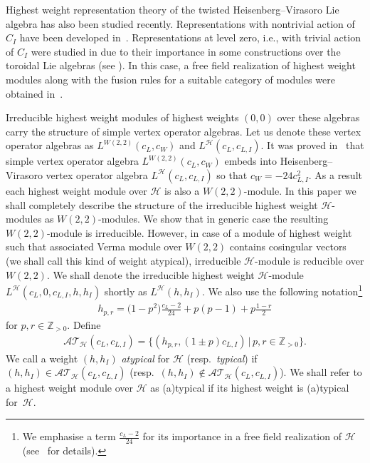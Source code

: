\documentclass[pdftex]{sigma}
\numberwithin{equation}{section}
\newcommand{\N}{{\mathbb Z}_{> 0} }
\newcommand{\HVir}{\mathcal H}
\begin{document}
Highest weight representation theory of the twisted Heisenberg--Virasoro Lie algebra has also been studied recently. Representations with nontrivial action of $C_{I}$ have been developed in~\cite{Arbarello}. Representations at level zero, i.e., with trivial action of $C_{I}$ were studied in \cite{Billig} due to their importance in some constructions over the toroidal Lie algebras (see \cite{Billig3, Billig2}). In this case, a free f\/ield realization of highest weight modules along with the fusion rules for a suitable category of modules were obtained in~\cite{nas}.

Irreducible highest weight modules of highest weights $(0,0)$ over these algebras carry the structure of simple vertex operator algebras. Let us denote these vertex operator algebras as $L^{W(2,2)} (c_L, c_W)$ and $L^{\HVir} (c_L, c_{L,I} )$. It was proved in~\cite{nas} that simple vertex operator algebra $L^{W(2,2)} (c_L, c_W)$ embeds into Heisenberg--Virasoro vertex operator algebra $L^{\HVir} (c_L, c_{L,I} )$ so that $c_W = -24 c_{L,I} ^2$. As a result each highest weight module over $\HVir$ is also a $W(2,2)$-module. In this paper we shall completely describe the structure of the irreducible highest weight $\HVir$-modules as $W(2,2)$-modules. We show that in generic case the resulting $W(2,2)$-module is irreducible. However, in case of a module of highest weight such that associated Verma module over $W(2,2)$ contains cosingular vectors (we shall call this kind of weight atypical), irreducible $\HVir$-module is reducible over $W(2,2)$.
We shall denote the irreducible highest weight $ \HVir $-module $L^{\HVir}(c_L,0,c_{L,I},h,h_I) $ shortly as $L^{\HVir}(h,h_I)$.
 We also use the following notation\footnote{We emphasise a term $\frac{c_L-2}{24} $ for its importance in a free f\/ield realization of $\HVir $ (see~\cite{nas} for details).}
\begin{gather*}
h_{p,r}=\big(1-p^{2}\big)\frac{c_{L}-2}{24}+p(p-1)+p\frac{1-r}{2} %
\end{gather*}
for $ p,r \in \N $. Def\/ine
\begin{gather*}
{\mathcal {AT} }_{\HVir} ( c_L, c_{L,I} ) = \{ (h_{p,r},(1\pm p)c_{L,I}) \,|\, p,r \in \N \}.
\end{gather*}
We call a weight $(h,h_I)$ \textit{atypical} for $\HVir $ (resp.\ \textit{typical}) if $(h,h_I) \in {\mathcal {AT} } _{\HVir} ( c_L, c_{L,I} ) $ (resp.\ $(h,h_I) \notin {\mathcal {AT} } _{\HVir} ( c_L, c_{L,I} ) $). We shall refer to a highest weight module over $\HVir$ as (a)typical if its highest weight is (a)typical for~$\HVir$.
\end{document}
